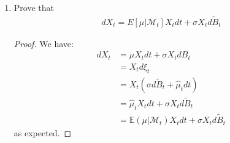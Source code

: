 \documentclass[11pt]{article}
\newcommand{\fcal}{\mathcal{F}}
\newcommand{\mcal}{\mathcal{M}}
\newcommand{\gt}{\theta}
\newcommand{\gs}{\sigma}
\newcommand{\E}{\mathbb{E}}
\begin{document}
\begin{enumerate}
\begin{proof}
\begin{align*}
d \xi_t = \gs d \widetilde{B}_t + \frac{\gs^{2} \bar{\mu} \gt }{\gs^2 \gt + t} dt + \frac{\xi_t}{\gs^2 \gt + t } dt 
\end{align*}
Taking $\frac{1}{\gs^2 \gt + t}$ as an integrating factor, we get:
\begin{align*}
d \Big( \frac{\xi_t}{\gs^2 \gt + t} \Big) &= -\xi_t \Big(\frac{\gs^2 \gt}{(\gs^2 \gt +t)^2} \Big) dt+ \frac{1}{\gs^2 \gt + t} d \xi_t\\
&= \frac{1}{\gs^2 \gt + t} \Big( \gs d \widetilde{B}_t + \frac{\bar{\mu}\gs^2}{\gs^2 \gt +t} \Big)
\end{align*}
Note 
Solving for $\xi_t$, we get:
\begin{align*}
\xi_t  &=\frac{\xi_0}{\gs^2 \gt}+ \int_0^t \frac{\bar{\mu} \gs^2 \gt}{(\gs^2 \gt + s)^2} ds + \int_0^t \frac{1}{\gs \gt +s} d B_s\\
&= -\bar{\mu} \gs^2 \gt \Big( \frac{1}{\gs^2 \gt + t} - \frac{1}{\gs^2 \gt} \Big) + \gs \int_0^t \frac{d \widetilde{B}_s}{\gs^2 \gt +s}\\
&= \bar{\mu} - \frac{\bar{\mu}\gs^2 \gt}{\gs^2 \gt + t}+\gs \int_0^t \frac{d \widetilde{B}_s}{\gs^2 \gt +s}
\end{align*}
which is an $\widetilde{\fcal}_t$-measurable function (everything is either constant or a stochastic integral of $\widetilde{B}_t$).  Therefore $\xi_t$ is $\widetilde{\fcal}_t$-measurable, and the given equality of filtrations holds.
\end{proof}
\item Prove that 
\begin{align*}
d X _ { t } = E [ \mu | \mathcal { M } _ { t } ] X _ { t } d t + \sigma X _ { t } d \widetilde { B } _ { t }
\end{align*}
\begin{proof}
We have:
\begin{align*}
dX_t &= \mu X_t dt + \gs X_t dB_t \\
&=  X_t d \xi_t\\
&= X_t ( \gs d \widetilde{B}_t + \hat{\mu}_t dt)\\
&= \hat{\mu}_t X_t dt + \gs X_t d \widetilde{B}_t\\
&= \E(\mu|\mcal_t) X_t dt + \gs X_t d \widetilde{B}_t
\end{align*}
as expected.
\end{proof}
\end{enumerate}
\end{document}
